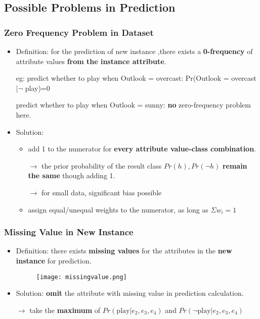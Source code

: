 \subsection{Possible Problems in Prediction}

\subsubsection{Zero Frequency Problem in Dataset}
\begin{itemize}
	\item Definition: for the prediction of new instance ,there exists a \textbf{0-frequency} of attribute values \textbf{from the instance attribute}. 
	
	eg: predict whether to play when Outlook = overcast: Pr(Outlook = overcast |$\neg$ play)=0
	
	predict whether to play when Outlook = sunny: \textbf{no} zero-frequency problem here.
	
	\item Solution:
	\begin{itemize}
		\item add 1 to the numerator for \textbf{every attribute value-class combination}.
		
		$\rightarrow$ the prior probability of the result class $Pr(h), Pr(\neg h)$ \textbf{remain the same} though adding 1. 
		
		$\rightarrow$ for small data, significant bias possible
		
		\item assign equal/unequal weights to the numerator, as long as $\Sigma w_i = 1$
	\end{itemize}
\end{itemize}

\subsubsection{Missing Value in New Instance}
\begin{itemize}
	\item Definition: there exists \textbf{missing values} for the attributes in the \textbf{new instance} for prediction.
	\begin{figure}[H]
		\centering
		\texttt{[image: missingvalue.png]}
	\end{figure}
	\item Solution: \textbf{omit} the attribute with missing value in prediction calculation.
	
	$\rightarrow$ take the \textbf{maximum} of $Pr(\text{play} | e_2, e_3,e_4)$ and $Pr(\neg \text{play}|e_2,e_3,e_4)$
\end{itemize}

